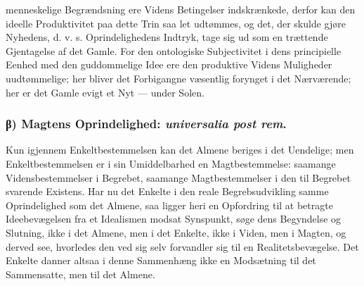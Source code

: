 \documentclass[11pt]{book}
\newcommand{\opage}[1]{\marginnote{\footnotesize\textit{[#1]}}}
\begin{document}
menneskelige Begrændsning ere Videns Betingelser indskrænkede, derfor
\opage{193} \setcounter{footnote}{0}%
kan den ideelle Produktivitet paa dette Trin saa let udtømmes, og det,
der skulde gjøre Nyhedens, d. v. s. Oprindelighedens Indtryk, tage sig
ud som en trættende Gjentagelse af det Gamle. For den ontologiske
Subjectivitet i dens principielle Eenhed med den guddommelige Idee ere
den produktive Videns Muligheder uudtømmelige; her bliver det
Forbigangne væsentlig forynget i det Nærværende; her er det Gamle evigt
et Nyt --- under Solen.

\subsubsection*{β) Magtens Oprindelighed: \textit{universalia post rem}.}

Kun igjennem Enkeltbestemmelsen kan det Almene beriges i det Uendelige;
men Enkeltbestemmelsen er i sin Umiddelbarhed en Magtbestemmelse:
saamange Vidensbestemmelser i Begrebet, saamange Magtbestemmelser i den
til Begrebet svarende Existens. Har nu det Enkelte i den reale
Begrebsudvikling samme Oprindelighed som det Almene, saa ligger heri en
Opfordring til at betragte Ideebevægelsen fra et Idealismen modsat
Synspunkt, søge dens Begyndelse og Slutning, ikke i det Almene, men i
det Enkelte, ikke i Viden, men i Magten, og derved see, hvorledes den
ved sig selv forvandler sig til en Realitetsbevægelse. Det Enkelte
danner altsaa i denne Sammenhæng ikke en Modsætning til det
Sammensatte, men til det Almene.
\end{document}
